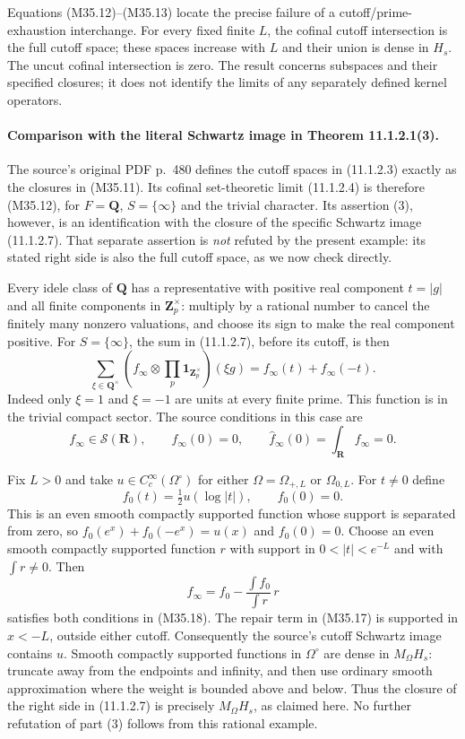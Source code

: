 Equations (M35.12)--(M35.13) locate the precise failure
of a cutoff/prime-exhaustion interchange.  For every
fixed finite $L$, the cofinal cutoff intersection is
the full cutoff space; these spaces increase with $L$
and their union is dense in $H_s$.  The uncut cofinal
intersection is zero.  The result concerns subspaces
and their specified closures; it does not identify
the limits of any separately defined kernel operators.

\paragraph{Comparison with the literal Schwartz image in
Theorem 11.1.2.1(3).}
The source's original PDF p.~480 defines the cutoff
spaces in (11.1.2.3) exactly as the closures in (M35.11).
Its cofinal set-theoretic limit (11.1.2.4) is therefore
(M35.12), for $F=\mathbf Q$, $S=\{\infty\}$ and the
trivial character.  Its assertion (3), however, is an
identification with the closure of the specific Schwartz
image (11.1.2.7).  That separate assertion is \emph{not}
refuted by the present example: its stated right side is
also the full cutoff space, as we now check directly.

Every idele class of $\mathbf Q$ has a representative
with positive real component $t=|g|$ and all finite
components in $\mathbf Z_p^\times$: multiply by a rational
number to cancel the finitely many nonzero valuations,
and choose its sign to make the real component positive.
For $S=\{\infty\}$, the sum in (11.1.2.7), before
its cutoff, is then
\[
 \sum_{\xi\in\mathbf Q^\times}
   \left(f_\infty\otimes\prod_p\mathbf1_{\mathbf Z_p^\times}\right)
                   (\xi g)
                          =f_\infty(t)+f_\infty(-t).
 \tag{M35.17}
\]
Indeed only $\xi=1$ and $\xi=-1$ are units at every
finite prime.  This function is in the trivial compact
sector.  The source conditions in this case are
\[
 f_\infty\in\mathcal S(\mathbf R),\qquad
                  f_\infty(0)=0,\qquad
                  \widehat f_\infty(0)=\int_{\mathbf R}f_\infty=0.
 \tag{M35.18}
\]

Fix $L>0$ and take $u\in C_c^\infty(\Omega^\circ)$
for either $\Omega=\Omega_{+,L}$ or $\Omega_{0,L}$.
For $t\ne0$ define
\[
                    f_0(t)=\tfrac12u(\log|t|),
                    \qquad f_0(0)=0.
 \tag{M35.19}
\]
This is an even smooth compactly supported function
whose support is separated from zero, so
$f_0(e^x)+f_0(-e^x)=u(x)$ and $f_0(0)=0$.
Choose an even smooth compactly supported function $r$
with support in $0<|t|<e^{-L}$ and with $\int r\ne0$.
Then
\[
                    f_\infty=f_0-
                            \frac{\int f_0}{\int r}\,r
 \tag{M35.20}
\]
satisfies both conditions in (M35.18).  The repair term
in (M35.17) is supported in $x<-L$, outside either
cutoff.  Consequently the source's cutoff Schwartz
image contains $u$.  Smooth compactly supported
functions in $\Omega^\circ$ are dense in $M_\Omega H_s$:
truncate away from the endpoints and infinity, and then
use ordinary smooth approximation where the weight is
bounded above and below.  Thus the closure of the
right side in (11.1.2.7) is precisely $M_\Omega H_s$,
as claimed here.  No further refutation of part (3)
follows from this rational example.

